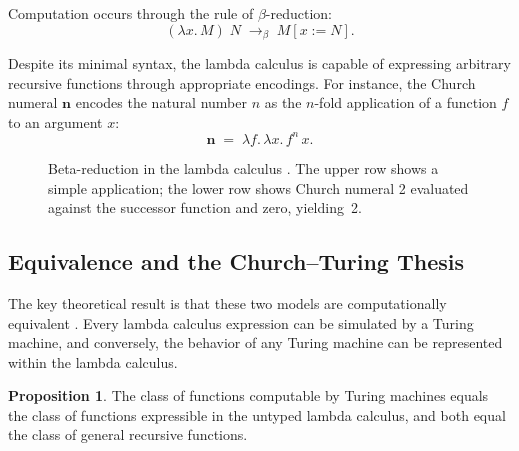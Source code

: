 \documentclass[12pt]{article}
\theoremstyle{definition}
\newtheorem{proposition}{Proposition}[section]
\begin{document}
Computation occurs through the rule of $\beta$-reduction:
\[
(\lambda x.\, M)\; N \;\longrightarrow_\beta\; M[x := N].
\]

Despite its minimal syntax, the lambda calculus is capable of expressing
arbitrary recursive functions through appropriate encodings. For
instance, the Church numeral $\mathbf{n}$ encodes the natural number
$n$ as the $n$-fold application of a function $f$ to an argument $x$:
\[
\mathbf{n} \;=\; \lambda f.\, \lambda x.\, f^n\, x.
\]

\begin{figure}[h]
\centering
{}
\caption{Beta-reduction in the lambda calculus \cite{church1936}. The
upper row shows a simple application; the lower row shows Church numeral
2 evaluated against the successor function and zero, yielding~2.}
\label{fig:lambda}
\end{figure}

\subsection{Equivalence and the Church--Turing Thesis}

The key theoretical result is that these two models are computationally
equivalent \cite{kleene1952}. Every lambda calculus expression can be
simulated by a Turing machine, and conversely, the behavior of any
Turing machine can be represented within the lambda calculus.

\begin{proposition}
\label{prop:equiv}
The class of functions computable by Turing machines equals the class
of functions expressible in the untyped lambda calculus, and both equal
the class of general recursive functions.
\end{proposition}
\end{document}

